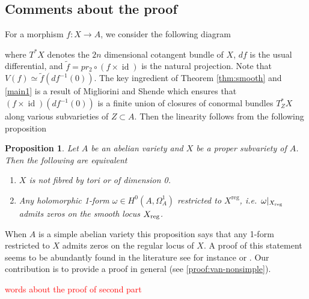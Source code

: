 \documentclass[a4paper,12pt,reqno]{amsart}
\theoremstyle{plain}
\newtheorem{proposition}[theorem]{Proposition}
\theoremstyle{remark}
\newcommand{\id}{\operatorname{id}}
\newcommand{\pr}{\operatorname{pr}}
\DeclareMathOperator{\reg}{reg}
\newcommand{\sorry}[1]{\textcolor{red}{#1}}
\begin{document}
 
\subsection{Comments about the proof}
For a morphism $f: X\to A$,  we consider the following diagram 
\begin{center}
\end{center}
 where $T^*X$ denotes the $2n$ dimensional 
cotangent bundle of $X$, $df$ is the usual differential, and $\tilde{f} = pr_2\circ (f\times \id)$ is the natural projection. Note that
$V(f) \simeq \tilde{f}(df^{-1}(0))$. 
The key ingredient of 
Theorem \ref{thm:smooth} and \ref{main1} is
a result of Migliorini and Shende \cite[Theorem C]{MiSh18} which ensures that $(f\times\id)(df^{-1}(0))$
is a finite union of closures of conormal bundles
$T^*_ZX$ along various subvarieties of $Z\subset A$.
Then the linearity follows from the following proposition
\begin{proposition}\label{van-nonsimple}
Let $A$ be an abelian variety and $X$ be a proper subvariety of $A$. Then the following are equivalent
\begin{enumerate}
	\item $X$ is not fibred by tori or of dimension 0. 
	\item Any holomorphic 1-form $\omega\in H^0(A, \Omega_A^1)$ restricted to $X^{\reg}$, i.e.\ $\omega|_{X_{\textnormal{reg}}}$ admits zeros on the smooth locus $X_{\textnormal{reg}}$.
\end{enumerate}
\end{proposition}
When $A$ is a
simple abelian variety this proposition says that any 1-form restricted to $X$ admits zeros on the regular locus of $X$. A proof of this statement seems to be abundantly found in the literature
see for instance \cite[Proposition 3.1]{HK05}
or \cite[Proposition 5.12]{LMW20}. Our contribution
is to provide a proof in general (see \ref{proof:van-nonsimple}).

\sorry{words about the proof of second part}


\end{document}
